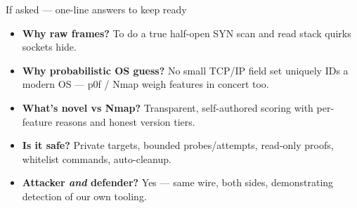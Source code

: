 \documentclass[10pt,aspectratio=169]{beamer}
\begin{document}
\begin{frame}{If asked --- one-line answers to keep ready}
  \small
  \begin{itemize}
    \item \textbf{Why raw frames?} To do a true half-open SYN scan and read
          stack quirks sockets hide.
    \item \textbf{Why probabilistic OS guess?} No small TCP/IP field set uniquely
          IDs a modern OS --- p0f / Nmap weigh features in concert too.
    \item \textbf{What's novel vs Nmap?} Transparent, self-authored scoring with
          per-feature reasons and honest version tiers.
    \item \textbf{Is it safe?} Private targets, bounded probes/attempts,
          read-only proofs, whitelist commands, auto-cleanup.
    \item \textbf{Attacker \emph{and} defender?} Yes --- same wire, both sides,
          demonstrating detection of our own tooling.
  \end{itemize}
\end{frame}
\end{document}
